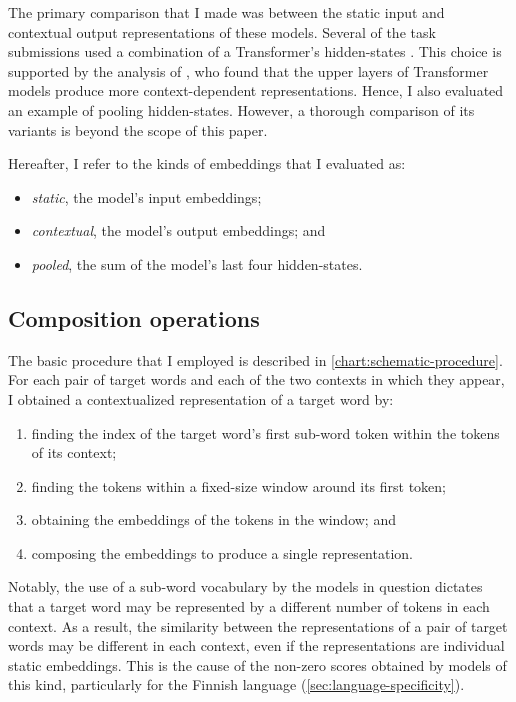The primary comparison that I made was between the static input and contextual output
representations of these models.
Several of the task submissions used a combination of a Transformer's hidden-states
\parencites[e.g.][276]{Gamallo2020}[61]{CostellaPessutto2020}[145]{Hettiarachchi2020}.
This choice is supported by the analysis of \textcites{Ethayarajh2019}, who found that
the upper layers of Transformer models produce more context-dependent representations.
Hence, I also evaluated an example of pooling hidden-states.
However, a thorough comparison of its variants is beyond the scope of this paper.
\begin{samepage}
  Hereafter, I refer to the kinds of embeddings that I evaluated as:
  \begin{itemize}
    \item \emph{static}, the model's input embeddings;
    \item \emph{contextual}, the model's output embeddings; and
    \item \emph{pooled}, the sum of the model's last four hidden-states.
  \end{itemize}
\end{samepage}

\subsection{Composition operations}
\label{sec:composition-operations}

The basic procedure that I employed is described in \cref{chart:schematic-procedure}.
For each pair of target words and each of the two contexts in which they appear, I
obtained a contextualized representation of a target word by:
\begin{enumerate}
  \item finding the index of the target word's first sub-word token within the tokens of its context;
  \item finding the tokens within a fixed-size window around its first token;
  \item obtaining the embeddings of the tokens in the window; and
  \item composing the embeddings to produce a single representation.
\end{enumerate}
Notably, the use of a sub-word vocabulary by the models in question
\parencites[e.g.,][4174]{Devlin2019} dictates that a target word may be represented by
a different number of tokens in each context.
As a result, the similarity between the representations of a pair of target words may
be different in each context, even if the representations are individual static
embeddings.
This is the cause of the non-zero scores obtained by models of this kind, particularly
for the Finnish language (\cref{sec:language-specificity}).

